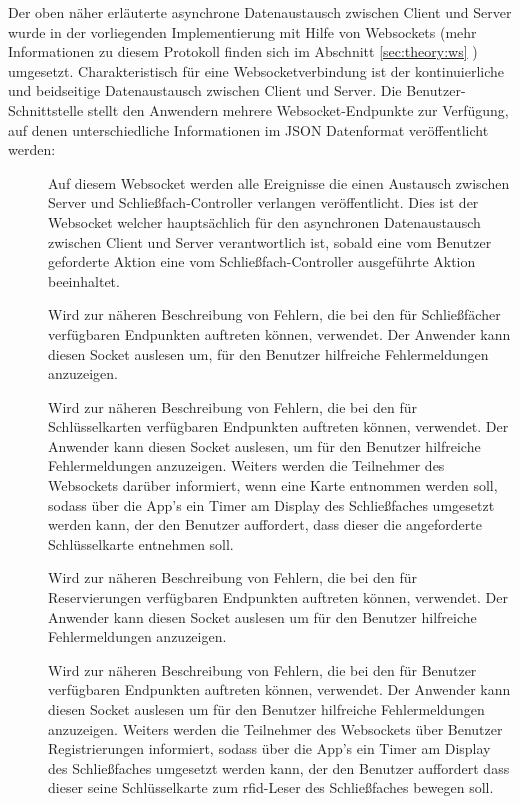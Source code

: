 \noindent
Der oben näher erläuterte asynchrone Datenaustausch zwischen Client und Server wurde in der vorliegenden Implementierung mit Hilfe von Websockets (mehr Informationen zu diesem Protokoll finden sich im Abschnitt \ref{sec:theory:ws} ) umgesetzt. Charakteristisch für eine Websocketverbindung ist der kontinuierliche und beidseitige Datenaustausch zwischen Client und Server. Die Benutzer-Schnittstelle stellt den Anwendern mehrere Websocket-Endpunkte zur Verfügung, auf denen unterschiedliche Informationen im JSON Datenformat veröffentlicht werden:
\begin{description}
\item[] Auf diesem Websocket werden alle Ereignisse die einen Austausch zwischen Server und Schließfach-Controller verlangen veröffentlicht. Dies ist der Websocket welcher hauptsächlich für den asynchronen Datenaustausch zwischen Client und Server verantwortlich ist, sobald eine vom Benutzer geforderte Aktion eine vom Schließfach-Controller ausgeführte Aktion beeinhaltet.     
\item[] Wird zur näheren Beschreibung von Fehlern, die bei den für Schließfächer verfügbaren Endpunkten auftreten können, verwendet. Der Anwender kann diesen Socket auslesen um, für den Benutzer hilfreiche Fehlermeldungen anzuzeigen.  
\item[] Wird zur näheren Beschreibung von Fehlern, die bei den für Schlüsselkarten verfügbaren Endpunkten auftreten können, verwendet. Der Anwender kann diesen Socket auslesen, um für den Benutzer hilfreiche Fehlermeldungen anzuzeigen. Weiters werden die Teilnehmer des Websockets darüber informiert, wenn eine Karte entnommen werden soll, sodass über die App's ein Timer am Display des Schließfaches umgesetzt werden kann, der den Benutzer auffordert, dass dieser die angeforderte Schlüsselkarte entnehmen soll.
\item[] Wird zur näheren Beschreibung von Fehlern, die bei den für Reservierungen verfügbaren Endpunkten auftreten können, verwendet. Der Anwender kann diesen Socket auslesen um für den Benutzer hilfreiche Fehlermeldungen anzuzeigen. 
\item[] Wird zur näheren Beschreibung von Fehlern, die bei den für Benutzer verfügbaren Endpunkten auftreten können, verwendet. Der Anwender kann diesen Socket auslesen um für den Benutzer hilfreiche Fehlermeldungen anzuzeigen. Weiters werden die Teilnehmer des Websockets über Benutzer Registrierungen informiert, sodass über die App's ein Timer am Display des Schließfaches umgesetzt werden kann, der den Benutzer auffordert dass dieser seine Schlüsselkarte zum \acrshort{rfid}-Leser des Schließfaches bewegen soll. 
\end{description}

